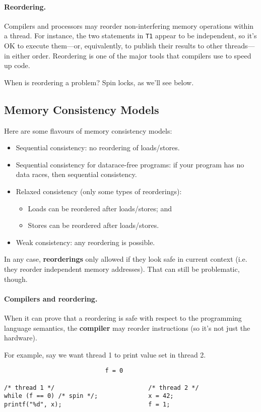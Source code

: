 \paragraph{Reordering.} Compilers and processors may reorder 
non-interfering memory operations within a thread. For instance, the
two statements in {\tt T1} appear to be independent, so it's OK to
execute them---or, equivalently, to publish their results to other
threads---in either order. Reordering is one of the major tools that
compilers use to speed up code.

When is reordering a problem? Spin locks, as we'll see below.

\subsection*{Memory Consistency Models}

Here are some flavours of memory consistency models:

\begin{itemize}
\item Sequential consistency: no reordering of loads/stores.
\item Sequential consistency for datarace-free programs: if your program
  has no data races, then sequential consistency.
\item Relaxed consistency (only some types of reorderings):
\begin{itemize}
        \item Loads can be reordered after loads/stores; and
        \item Stores can be reordered after loads/stores.
\end{itemize}
\item     Weak consistency: any reordering is possible.
\end{itemize}

In any case, {\bf reorderings} only allowed if they look safe in
current context (i.e. they reorder independent memory addresses).
That can still be problematic, though.

\paragraph{Compilers and reordering.}
When it can prove that a reordering is safe with respect to the
programming language semantics, the {\bf compiler} may reorder instructions (so it's not just the hardware).

For example, say we want thread 1 to print value set in thread 2.
  \begin{verbatim}
                            f = 0

/* thread 1 */                          /* thread 2 */
while (f == 0) /* spin */;              x = 42;
printf("%d", x);                        f = 1;
  \end{verbatim}

